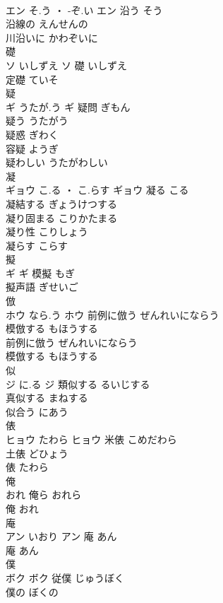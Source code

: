 \documentclass[8pt]{extreport}
\begin{document}
\begin{CJK}{UTF8}{min}
\\	エン	そ.う ・ -ぞ.い	エン	沿う	そう	
\\	沿線の	えんせんの	
\\	川沿いに	かわぞいに	
\\	礎	
\\	ソ	いしずえ	ソ													礎	いしずえ	
\\	定礎	ていそ	
\\	疑	
\\	ギ	うたが.う	ギ	疑問	ぎもん	
\\	疑う	うたがう	
\\	疑惑	ぎわく	
\\	容疑	ようぎ	
\\	疑わしい	うたがわしい	
\\	凝	
\\	ギョウ	こ.る ・ こ.らす	ギョウ	凝る	こる	
\\	凝結する	ぎょうけつする	
\\	凝り固まる	こりかたまる	
\\	凝り性	こりしょう	
\\	凝らす	こらす	
\\	擬	
\\	ギ		ギ	模擬	もぎ	
\\	擬声語	ぎせいご	
\\	倣	
\\	ホウ	なら.う	ホウ	前例に倣う	ぜんれいにならう	
\\	模倣する	もほうする	
\\	前例に倣う	ぜんれいにならう	
\\	模倣する	もほうする	
\\	似	
\\	ジ	に.る	ジ	類似する	るいじする	
\\	真似する	まねする	
\\	似合う	にあう	
\\	俵	
\\	ヒョウ	たわら	ヒョウ	米俵	こめだわら	
\\	土俵	どひょう	
\\	俵	たわら	
\\	俺	
\\	おれ		俺ら	おれら	
\\	俺	おれ	
\\	庵	
\\	アン	いおり	アン	庵	あん	
\\	庵	あん	
\\	僕	
\\	ボク		ボク	従僕	じゅうぼく	
\\	僕の	ぼくの	

\end{CJK}
\end{document}
